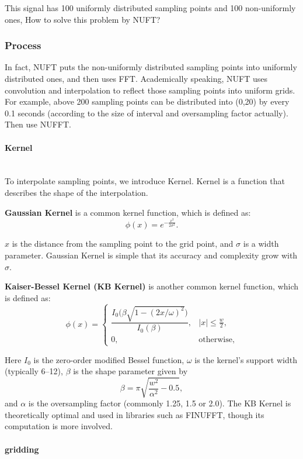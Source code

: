 \documentclass[12pt]{ctexart}
\begin{document}
This signal has 100 uniformly distributed sampling points and 100 non-uniformly ones,
How to solve this problem by NUFT?

\subsubsection{\textbf{Process}}

In fact, NUFT puts the non-uniformly distributed sampling points into uniformly
distributed ones, and then uses FFT. Academically speaking, NUFT uses convolution and
interpolation to reflect those sampling points into uniform grids. For example, above
200 sampling points can be distributed into (0,20) by every 0.1 seconds (according to
the size of interval and oversampling factor actually). Then use NUFFT.

\paragraph{\textbf{Kernel}}\mbox{}\\

To interpolate sampling points, we introduce Kernel. Kernel is a function that
describes the shape of the interpolation.

\textbf{Gaussian Kernel} is a common kernel function, which is defined as:
\[
  \phi(x) = e^{-\frac{x^2}{2\sigma^2}}.
\]

$x$ is the distance from the sampling point to the grid point, and $σ$ is a width
parameter. Gaussian Kernel is simple that its accuracy and complexity grow with $σ$.

\textbf{Kaiser-Bessel Kernel (KB Kernel)} is another common kernel function, which is
defined as:
\[
  \phi(x) =
  \begin{cases}
    \dfrac{I_0\!\bigl(\beta\sqrt{1 - (2x/\omega)^2}\bigr)}{I_0(\beta)}, & |x|\le
    \tfrac{w}{2},\\ 0, & \text{otherwise},
  \end{cases}
\]

Here $I_0$ is the zero-order modified Bessel function, $\omega$ is the kernel’s support
width (typically 6–12), $\beta$ is the shape parameter given by
\[
  \beta = \pi\sqrt{\frac{w^2}{\alpha^2} - 0.5},
\]
and $\alpha$ is the oversampling factor (commonly 1.25, 1.5 or 2.0). The KB Kernel is
theoretically optimal and used in libraries such as FINUFFT, though its computation is
more involved.

\paragraph{\textbf{gridding}}\mbox{}\\
\end{document}
